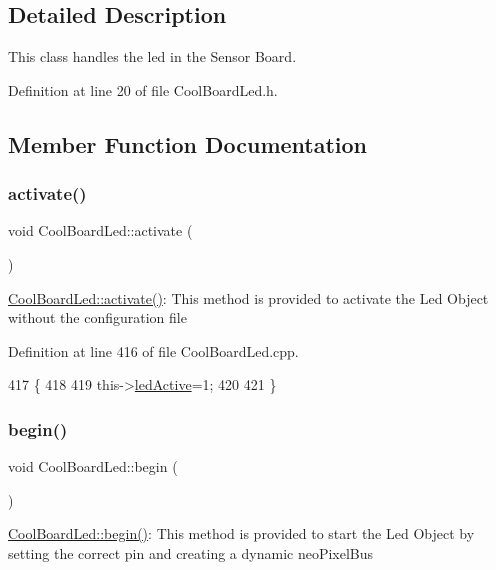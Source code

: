 \subsection{Detailed Description}
This class handles the led in the Sensor Board. 

Definition at line 20 of file Cool\+Board\+Led.\+h.



\subsection{Member Function Documentation}
\mbox{\label{class_cool_board_led_ae74fe4b47d06c3a97b468ba220c4eb99}} 
\subsubsection{\texorpdfstring{activate()}{activate()}}
{\footnotesize\ttfamily void Cool\+Board\+Led\+::activate (\begin{DoxyParamCaption}{ }\end{DoxyParamCaption})}

\hyperlink{class_cool_board_led_ae74fe4b47d06c3a97b468ba220c4eb99}{Cool\+Board\+Led\+::activate()}\+: This method is provided to activate the Led Object without the configuration file 

Definition at line 416 of file Cool\+Board\+Led.\+cpp.


\begin{DoxyCode}
417 \{
418 
419     this->\hyperlink{class_cool_board_led_a5f17c135516fcf4b44ea8a096ba0177a}{ledActive}=1;
420 
421 \}
\end{DoxyCode}
\mbox{\label{class_cool_board_led_ae3cbde8affcc6f011cbd698c8ef911f6}} 
\subsubsection{\texorpdfstring{begin()}{begin()}}
{\footnotesize\ttfamily void Cool\+Board\+Led\+::begin (\begin{DoxyParamCaption}{ }\end{DoxyParamCaption})}

\hyperlink{class_cool_board_led_ae3cbde8affcc6f011cbd698c8ef911f6}{Cool\+Board\+Led\+::begin()}\+: This method is provided to start the Led Object by setting the correct pin and creating a dynamic neo\+Pixel\+Bus 

